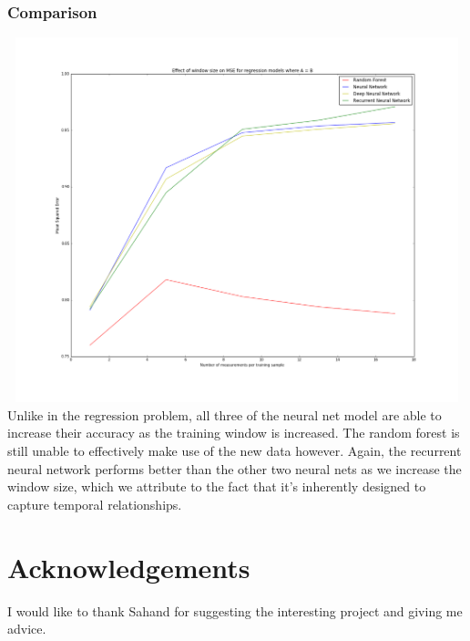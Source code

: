 \documentclass[12pt,a4paper]{article}
\begin{document}
\subsubsection{Comparison}
\includegraphics[height=400px, width=1.1\textwidth]{len_sequence_v_accuracy_classification}
Unlike in the regression problem, all three of the neural net model are able to increase their accuracy as the training window is increased.  The random forest is still unable to effectively make use of the new data however.  Again, the recurrent neural network performs better than the other two neural nets as we increase the window size, which we attribute to the fact that it's inherently designed to capture temporal relationships.  

\section{Acknowledgements}
I would like to thank Sahand for suggesting the interesting project and giving me advice.

 
\end{document}
